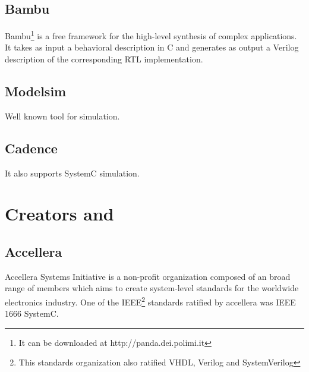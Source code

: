 \documentclass{article}
\begin{document}
	  \subsection{Bambu}
	  Bambu\footnote{It can be downloaded at http://panda.dei.polimi.it} is a free framework for the high-level synthesis of complex applications.
	  It takes as input a behavioral description in C and generates as output a Verilog description of the corresponding RTL implementation.
	  \subsection{Modelsim}
	  Well known tool for simulation.
	  
	  \subsection{Cadence}
	  It also supports SystemC simulation.
	\section{Creators and }
	  \subsection{Accellera}
	  Accellera Systems Initiative is a non-profit organization composed of an broad range of members which aims to create system-level standards for the worldwide electronics industry.
	  One of the IEEE\footnote{This standards organization also ratified VHDL, Verilog and SystemVerilog} standards ratified by accellera was IEEE 1666 SystemC.
	  
\end{document}
